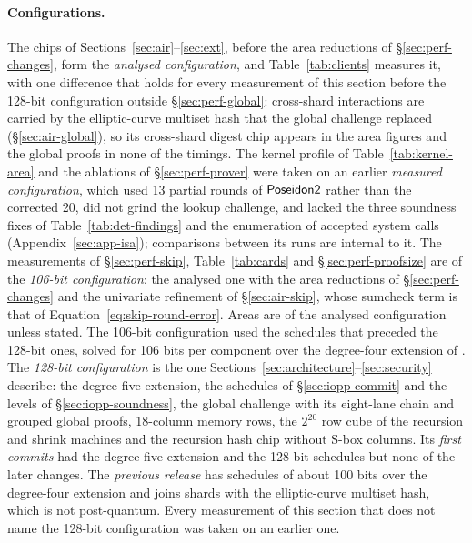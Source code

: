\paragraph{Configurations.}\label{sec:perf-revision} The chips of Sections~\ref{sec:air}--\ref{sec:ext}, before the area reductions of \S\ref{sec:perf-changes}, form the \emph{analysed configuration}, and Table~\ref{tab:clients} measures it, with one difference that holds for every measurement of this section before the 128-bit configuration outside \S\ref{sec:perf-global}: cross-shard interactions are carried by the elliptic-curve multiset hash that the global challenge replaced (\S\ref{sec:air-global}), so its cross-shard digest chip appears in the area figures and the global proofs in none of the timings. The kernel profile of Table~\ref{tab:kernel-area} and the ablations of \S\ref{sec:perf-prover} were taken on an earlier \emph{measured configuration}, which used 13 partial rounds of $\mathsf{Poseidon2}{}$ rather than the corrected 20, did not grind the lookup challenge, and lacked the three soundness fixes of Table~\ref{tab:det-findings} and the enumeration of accepted system calls (Appendix~\ref{sec:app-isa}); comparisons between its runs are internal to it. The measurements of \S\ref{sec:perf-skip}, Table~\ref{tab:cards} and \S\ref{sec:perf-proofsize} are of the \emph{106-bit configuration}: the analysed one with the area reductions of \S\ref{sec:perf-changes} and the univariate refinement of \S\ref{sec:air-skip}, whose sumcheck term is that of Equation~\eqref{eq:skip-round-error}. Areas are of the analysed configuration unless stated. The 106-bit configuration used the schedules that preceded the 128-bit ones, solved for 106 bits per component over the degree-four extension of \KB{}. The \emph{128-bit configuration} is the one Sections~\ref{sec:architecture}--\ref{sec:security} describe: the degree-five extension, the schedules of \S\ref{sec:iopp-commit} and the levels of \S\ref{sec:iopp-soundness}, the global challenge with its eight-lane chain and grouped global proofs, 18-column memory rows, the $2^{20}$ row cube of the recursion and shrink machines and the recursion hash chip without S-box columns. Its \emph{first commits} had the degree-five extension and the 128-bit schedules but none of the later changes. The \emph{previous release} has schedules of about 100 bits over the degree-four extension and joins shards with the elliptic-curve multiset hash, which is not post-quantum. Every measurement of this section that does not name the 128-bit configuration was taken on an earlier one.

